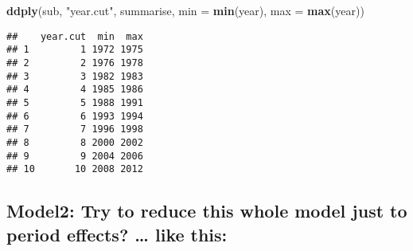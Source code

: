 \documentclass[]{article}
\newenvironment{Shaded}{\begin{snugshade}}{\end{snugshade}}
\newcommand{\DataTypeTok}[1]{\textcolor[rgb]{0.13,0.29,0.53}{#1}}
\newcommand{\DecValTok}[1]{\textcolor[rgb]{0.00,0.00,0.81}{#1}}
\newcommand{\KeywordTok}[1]{\textcolor[rgb]{0.13,0.29,0.53}{\textbf{#1}}}
\newcommand{\NormalTok}[1]{#1}
\newcommand{\OperatorTok}[1]{\textcolor[rgb]{0.81,0.36,0.00}{\textbf{#1}}}
\newcommand{\StringTok}[1]{\textcolor[rgb]{0.31,0.60,0.02}{#1}}
\begin{document}
\begin{Shaded}
\begin{Highlighting}[]
\KeywordTok{ddply}\NormalTok{(sub, }\StringTok{"year.cut"}\NormalTok{, summarise, }\DataTypeTok{min =} \KeywordTok{min}\NormalTok{(year), }\DataTypeTok{max =} \KeywordTok{max}\NormalTok{(year))}
\end{Highlighting}
\end{Shaded}

\begin{verbatim}
##    year.cut  min  max
## 1         1 1972 1975
## 2         2 1976 1978
## 3         3 1982 1983
## 4         4 1985 1986
## 5         5 1988 1991
## 6         6 1993 1994
## 7         7 1996 1998
## 8         8 2000 2002
## 9         9 2004 2006
## 10       10 2008 2012
\end{verbatim}

\hypertarget{model2-try-to-reduce-this-whole-model-just-to-period-effects-like-this}{%
\subsection{Model2: Try to reduce this whole model just to period
effects? \ldots{} like
this:}\label{model2-try-to-reduce-this-whole-model-just-to-period-effects-like-this}}

\begin{Shaded}
\end{Shaded}
\end{document}
